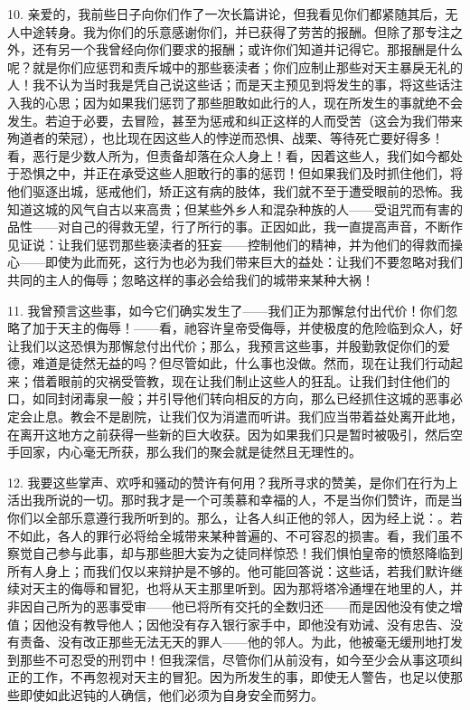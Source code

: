 10. 亲爱的，我前些日子向你们作了一次长篇讲论，但我看见你们都紧随其后，无人中途转身。我为你们的乐意感谢你们，并已获得了劳苦的报酬。但除了那专注之外，还有另一个我曾经向你们要求的报酬；或许你们知道并记得它。那报酬是什么呢？就是你们应惩罚和责斥城中的那些亵渎者；你们应制止那些对天主暴戾无礼的人！我不认为当时我是凭自己说这些话；而是天主预见到将发生的事，将这些话注入我的心思；因为如果我们惩罚了那些胆敢如此行的人，现在所发生的事就绝不会发生。若迫于必要，去冒险，甚至为惩戒和纠正这样的人而受苦（这会为我们带来殉道者的荣冠），也比现在因这些人的悖逆而恐惧、战栗、等待死亡要好得多！看，恶行是少数人所为，但责备却落在众人身上！看，因着这些人，我们如今都处于恐惧之中，并正在承受这些人胆敢行的事的惩罚！但如果我们及时抓住他们，将他们驱逐出城，惩戒他们，矫正这有病的肢体，我们就不至于遭受眼前的恐怖。我知道这城的风气自古以来高贵；但某些外乡人和混杂种族的人——受诅咒而有害的品性——对自己的得救无望，行了所行的事。正因如此，我一直提高声音，不断作见证说：让我们惩罚那些亵渎者的狂妄——控制他们的精神，并为他们的得救而操心——即使为此而死，这行为也必为我们带来巨大的益处：让我们不要忽略对我们共同的主人的侮辱；忽略这样的事必会给我们的城带来某种大祸！\par

11. 我曾预言这些事，如今它们确实发生了——我们正为那懈怠付出代价！你们忽略了加于天主的侮辱！——看，祂容许皇帝受侮辱，并使极度的危险临到众人，好让我们以这恐惧为那懈怠付出代价；那么，我预言这些事，并殷勤敦促你们的爱德，难道是徒然无益的吗？但尽管如此，什么事也没做。然而，现在让我们行动起来；借着眼前的灾祸受管教，现在让我们制止这些人的狂乱。让我们封住他们的口，如同封闭毒泉一般；并引导他们转向相反的方向，那么已经抓住这城的恶事必定会止息。教会不是剧院，让我们仅为消遣而听讲。我们应当带着益处离开此地，在离开这地方之前获得一些新的巨大收获。因为如果我们只是暂时被吸引，然后空手回家，内心毫无所获，那么我们的聚会就是徒然且无理性的。\par

12. 我要这些掌声、欢呼和骚动的赞许有何用？我所寻求的赞美，是你们在行为上活出我所说的一切。那时我才是一个可羡慕和幸福的人，不是当你们赞许，而是当你们以全部乐意遵行我所听到的。那么，让各人纠正他的邻人，因为经上说：。若不如此，各人的罪行必将给全城带来某种普遍的、不可容忍的损害。看，我们虽不察觉自己参与此事，却与那些胆大妄为之徒同样惊恐！我们惧怕皇帝的愤怒降临到所有人身上；而我们仅以来辩护是不够的。他可能回答说：这些话，若我们默许继续对天主的侮辱和冒犯，也将从天主那里听到。因为那将塔冷通埋在地里的人，并非因自己所为的恶事受审——他已将所有交托的全数归还——而是因他没有使之增值；因他没有教导他人；因他没有存入银行家手中，即他没有劝诫、没有忠告、没有责备、没有改正那些无法无天的罪人——他的邻人。为此，他被毫无缓刑地打发到那些不可忍受的刑罚中！但我深信，尽管你们从前没有，如今至少会从事这项纠正的工作，不再忽视对天主的冒犯。因为所发生的事，即使无人警告，也足以使那些即使如此迟钝的人确信，他们必须为自身安全而努力。\par

